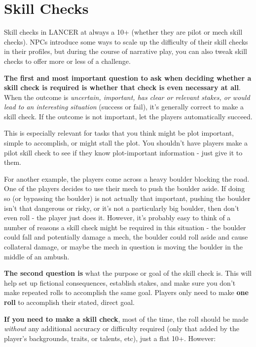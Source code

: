 \section{Skill Checks}

Skill checks in LANCER at always a 10+ (whether they are pilot or mech skill checks). NPCs
introduce some ways to scale up the difficulty of their skill checks in their profiles, but during the
course of narrative play, you can also tweak skill checks to offer more or less of a challenge.

\textbf{The first and most important question to ask when deciding whether a skill check is
required is whether that check is even necessary at all}. When the outcome is \textit{uncertain,
important, has clear or relevant stakes, or would lead to an interesting situation} (success or fail),
it’s generally correct to make a skill check. If the outcome is not important, let the players
automatically succeed.

This is especially relevant for tasks that you think might be plot important, simple to accomplish,
or might stall the plot. You shouldn’t have players make a pilot skill check to see if they know
plot-important information - just give it to them.

For another example, the players come across a heavy boulder blocking the road. One of the
players decides to use their mech to push the boulder aside. If doing so (or bypassing the
boulder) is not actually that important, pushing the boulder isn’t that dangerous or risky, or it’s
not a particularly big boulder, then don’t even roll - the player just does it. However, it’s probably
easy to think of a number of reasons a skill check might be required in this situation - the boulder
could fall and potentially damage a mech, the boulder could roll aside and cause collateral
damage, or maybe the mech in question is moving the boulder in the middle of an ambush.

\textbf{The second question is} what the purpose or goal of the skill check is. This will help set up
fictional consequences, establish stakes, and make sure you don’t make repeated rolls to
accomplish the same goal. Players only need to make \textbf{one roll} to accomplish their stated, direct
goal.

\textbf{If you need to make a skill check}, most of the time, the roll should be made \textit{without} any
additional accuracy or difficulty required (only that added by the player’s backgrounds, traits, or
talents, etc), just a flat 10+. However:

